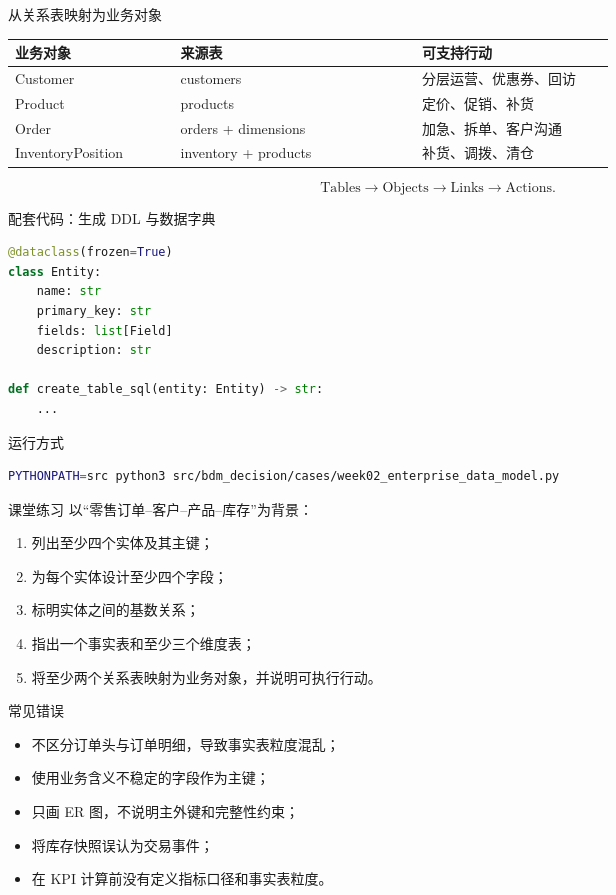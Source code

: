 \documentclass[UTF8,fontset=fandol,aspectratio=169,11pt]{ctexbeamer}
\begin{document}
\begin{frame}{从关系表映射为业务对象}
\begin{table}
\small
\centering
\begin{tabular}{p{0.24\linewidth}p{0.35\linewidth}p{0.28\linewidth}}
\toprule
业务对象 & 来源表 & 可支持行动\\
\midrule
Customer & customers & 分层运营、优惠券、回访\\
Product & products & 定价、促销、补货\\
Order & orders + dimensions & 加急、拆单、客户沟通\\
InventoryPosition & inventory + products & 补货、调拨、清仓\\
\bottomrule
\end{tabular}
\end{table}

\[
\text{Tables}\rightarrow\text{Objects}\rightarrow\text{Links}\rightarrow\text{Actions}.
\]
\end{frame}

\begin{frame}[fragile]{配套代码：生成 DDL 与数据字典}
\begin{lstlisting}[language=Python]
@dataclass(frozen=True)
class Entity:
    name: str
    primary_key: str
    fields: list[Field]
    description: str

def create_table_sql(entity: Entity) -> str:
    ...
\end{lstlisting}

\begin{block}{运行方式}
\begin{lstlisting}[language=bash]
PYTHONPATH=src python3 src/bdm_decision/cases/week02_enterprise_data_model.py
\end{lstlisting}
\end{block}
\end{frame}

\begin{frame}{课堂练习}
以“零售订单--客户--产品--库存”为背景：
\begin{enumerate}
  \item 列出至少四个实体及其主键；
  \item 为每个实体设计至少四个字段；
  \item 标明实体之间的基数关系；
  \item 指出一个事实表和至少三个维度表；
  \item 将至少两个关系表映射为业务对象，并说明可执行行动。
\end{enumerate}
\end{frame}

\begin{frame}{常见错误}
\begin{itemize}
  \item 不区分订单头与订单明细，导致事实表粒度混乱；
  \item 使用业务含义不稳定的字段作为主键；
  \item 只画 ER 图，不说明主外键和完整性约束；
  \item 将库存快照误认为交易事件；
  \item 在 KPI 计算前没有定义指标口径和事实表粒度。
\end{itemize}
\end{frame}
\end{document}
